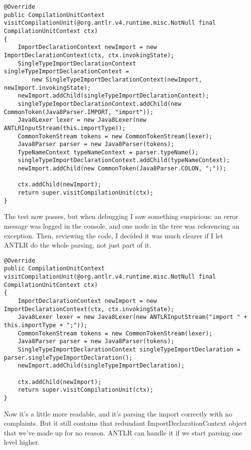 \documentclass[11pt]{article}
\begin{document}
\begin{verbatim}
@Override
public CompilationUnitContext visitCompilationUnit(@org.antlr.v4.runtime.misc.NotNull final CompilationUnitContext ctx)
{
    ImportDeclarationContext newImport = new ImportDeclarationContext(ctx, ctx.invokingState);
    SingleTypeImportDeclarationContext singleTypeImportDeclarationContext =
        new SingleTypeImportDeclarationContext(newImport, newImport.invokingState);
    newImport.addChild(singleTypeImportDeclarationContext);
    singleTypeImportDeclarationContext.addChild(new CommonToken(Java8Parser.IMPORT, "import"));
    Java8Lexer lexer = new Java8Lexer(new ANTLRInputStream(this.importType));
    CommonTokenStream tokens = new CommonTokenStream(lexer);
    Java8Parser parser = new Java8Parser(tokens);
    TypeNameContext typeNameContext = parser.typeName();
    singleTypeImportDeclarationContext.addChild(typeNameContext);
    newImport.addChild(new CommonToken(Java8Parser.COLON, ";"));

    ctx.addChild(newImport);
    return super.visitCompilationUnit(ctx);
}
\end{verbatim}

The test now passes, but when debugging I saw something suspicious: an error message was logged in the console, and one
node in the tree was referencing an exception. Then, reviewing the code, I decided it was much clearer if I let ANTLR
do the whole parsing, not just part of it.

\begin{verbatim}
@Override
public CompilationUnitContext visitCompilationUnit(@org.antlr.v4.runtime.misc.NotNull final CompilationUnitContext ctx)
{
    ImportDeclarationContext newImport = new ImportDeclarationContext(ctx, ctx.invokingState);
    Java8Lexer lexer = new Java8Lexer(new ANTLRInputStream("import " + this.importType + ";"));
    CommonTokenStream tokens = new CommonTokenStream(lexer);
    Java8Parser parser = new Java8Parser(tokens);
    SingleTypeImportDeclarationContext singleTypeImportDeclaration = parser.singleTypeImportDeclaration();
    newImport.addChild(singleTypeImportDeclaration);

    ctx.addChild(newImport);
    return super.visitCompilationUnit(ctx);
}
\end{verbatim}

Now it's a little more readable, and it's parsing the import correctly with no complaints. But it still contains that redundant
ImportDeclarationContext object that we've made up for no reason. ANTLR can handle it if we start parsing one level higher.
\end{document}
